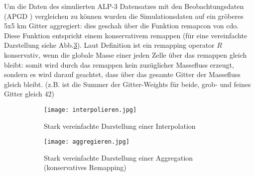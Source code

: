 Um die Daten des simulierten ALP-3 Datensatzes mit den Beobachtungsdaten (APGD \cite{meteoswiss}) vergleichen zu können wurden die Simulationsdaten auf ein gröberes 5x5 km Gitter aggregiert: dies geschah über die Funktion remapcon von cdo. Diese Funktion entspricht einem konservativem remappen (für eine vereinfachte Darstellung siehe Abb.\ref{fig:aggregieren}). Laut Definition \cite{remapcon} ist ein remapping operator $R$ konservativ, wenn die globale Masse einer jeden Zelle über das remappen gleich bleibt: somit wird durch das remappen kein zuzüglicher Massefluss erzeugt, sondern es wird darauf geachtet, dass über das gesamte Gitter der Massefluss gleich bleibt. (z.B. ist die Summer der Gitter-Weights für beide, grob- und feines Gitter gleich 42)
\begin{figure}[h]
	\begin{subfigure}{0.49\textwidth}
		\texttt{[image: interpolieren.jpg]}
		\caption{Stark vereinfachte Darstellung einer Interpolation}
		\label{fig:interpolieren}
	\end{subfigure}
	\begin{subfigure}{0.49\textwidth}
		\texttt{[image: aggregieren.jpg]}
		\caption{Stark vereinfachte Darstellung einer Aggregation (konservatives Remapping)}
		\label{fig:aggregieren}
	\end{subfigure}
	\caption{}
\end{figure}